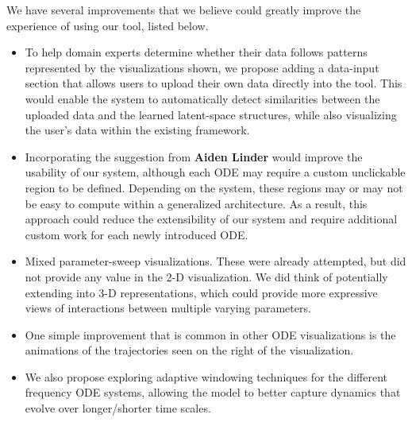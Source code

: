 \documentclass{article}
\begin{document}
We have several improvements that we believe could greatly improve the
experience of using our tool, listed below.

\begin{itemize}

 \item To help domain experts determine whether their data follows patterns
    represented by the visualizations shown, we propose adding a data-input
    section that allows users to upload their own data directly into the tool.
    This would enable the system to automatically detect similarities between
    the uploaded data and the learned latent-space structures, while also
    visualizing the user's data within the existing framework.
    
    \item Incorporating the suggestion from \textbf{Aiden Linder} would improve
    the usability of our system, although each ODE may require a custom
    unclickable region to be defined. Depending on the system, these regions
    may or may not be easy to compute within a generalized architecture. As a
    result, this approach could reduce the extensibility of our system and
    require additional custom work for each newly introduced ODE.

    \item Mixed parameter-sweep visualizations. These were already attempted, but did not provide any value in the 2-D visualization. We did think of potentially extending into 3-D
    representations, which could provide more expressive views of interactions
    between multiple varying parameters.

    \item One simple improvement that is common in other ODE visualizations is the animations of the trajectories seen on the right of the visualization.
    
     \item We also propose exploring adaptive windowing techniques for
    the different frequency ODE systems, allowing the model to better capture dynamics
    that evolve over longer/shorter time scales.
\end{itemize}
\end{document}
